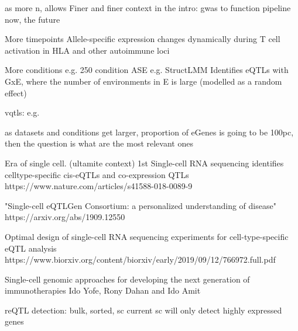 \begin{outline}
as more n, allows
Finer and finer context
    in the intro: gwas to function pipeline
    now, the future

    More timepoints
    Allele-specific expression changes dynamically during T cell activation in HLA and other autoimmune loci

    More conditions
    e.g. 250 condition ASE %
    e.g. StructLMM 
        Identifies eQTLs with GxE, where the number of environments in E is large (modelled as a random effect)

        vqtls: e.g. %

    as datasets and conditions get larger, proportion of eGenes is going to be 100pc, then the question is what are the most relevant ones

    Era of single cell. (ultamite context)
        1st
        Single-cell RNA sequencing identifies celltype-specific cis-eQTLs and co-expression QTLs
        https://www.nature.com/articles/s41588-018-0089-9

        "Single-cell eQTLGen Consortium: a personalized understanding of disease"
        https://arxiv.org/abs/1909.12550

        Optimal design of single-cell RNA sequencing experiments for cell-type-specific eQTL analysis
        https://www.biorxiv.org/content/biorxiv/early/2019/09/12/766972.full.pdf

        Single-cell genomic approaches for developing the next generation of immunotherapies Ido Yofe, Rony Dahan and Ido Amit


        reQTL detection: bulk, sorted, sc
        current sc will only detect highly expressed genes


\end{outline}
